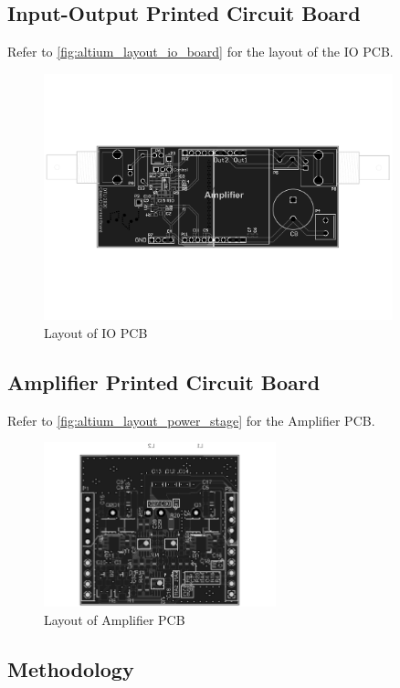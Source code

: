 \subsection{Input-Output Printed Circuit Board}
Refer to \autoref{fig:altium_layout_io_board} for the layout of the IO PCB.
\begin{figure}[htbp]
	\centering
	\includegraphics[width=0.9\textwidth,trim=0 175 0 175, clip]{0_Figures/Production/Control_PCB.pdf}
	\caption{Layout of IO PCB}
	\label{fig:altium_layout_io_board}
\end{figure}
\subsection{Amplifier Printed Circuit Board}
Refer to \autoref{fig:altium_layout_power_stage} for the Amplifier PCB.
\begin{figure}[htbp]
	\centering
	\includegraphics[width=0.6\textwidth,trim=60 0 60 40, clip]{0_Figures/Production/Power_Stage.pdf}
	\caption{Layout of Amplifier PCB}
	\label{fig:altium_layout_power_stage}
\end{figure}

\subsection{Methodology}


